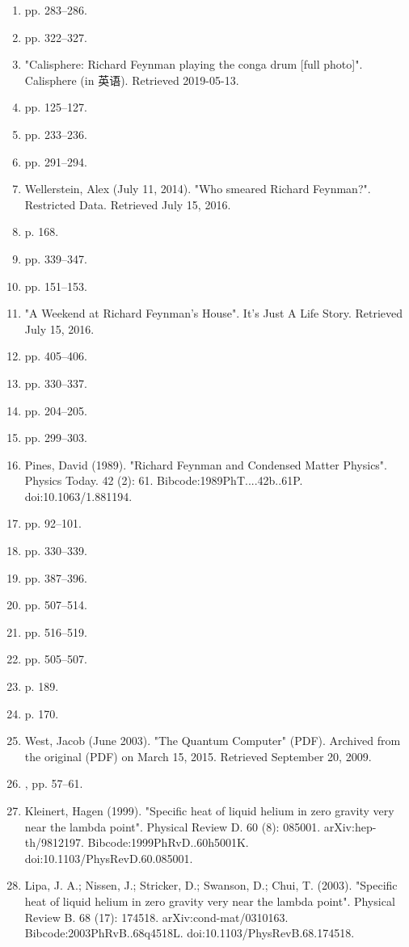 \begin{enumerate}
\item  pp. 283–286.
\item  pp. 322–327.
\item "Calisphere: Richard Feynman playing the conga drum [full photo]". Calisphere (in 英语). Retrieved 2019-05-13.
\item  pp. 125–127.
\item  pp. 233–236.
\item  pp. 291–294.
\item Wellerstein, Alex (July 11, 2014). "Who smeared Richard Feynman?". Restricted Data. Retrieved July 15, 2016.
\item  p. 168.
\item  pp. 339–347.
\item  pp. 151–153.
\item "A Weekend at Richard Feynman's House". It's Just A Life Story. Retrieved July 15, 2016.
\item  pp. 405–406.
\item  pp. 330–337.
\item  pp. 204–205.
\item  pp. 299–303.
\item Pines, David (1989). "Richard Feynman and Condensed Matter Physics". Physics Today. 42 (2): 61. Bibcode:1989PhT....42b..61P. doi:10.1063/1.881194.
\item  pp. 92–101.
\item  pp. 330–339.
\item  pp. 387–396.
\item  pp. 507–514.
\item  pp. 516–519.
\item  pp. 505–507.
\item  p. 189.
\item  p. 170.
\item West, Jacob (June 2003). "The Quantum Computer" (PDF). Archived from the original (PDF) on March 15, 2015. Retrieved September 20, 2009.
\item , pp. 57–61.
\item Kleinert, Hagen (1999). "Specific heat of liquid helium in zero gravity very near the lambda point". Physical Review D. 60 (8): 085001. arXiv:hep-th/9812197. Bibcode:1999PhRvD..60h5001K. doi:10.1103/PhysRevD.60.085001.
\item Lipa, J. A.; Nissen, J.; Stricker, D.; Swanson, D.; Chui, T. (2003). "Specific heat of liquid helium in zero gravity very near the lambda point". Physical Review B. 68 (17): 174518. arXiv:cond-mat/0310163. Bibcode:2003PhRvB..68q4518L. doi:10.1103/PhysRevB.68.174518.

\end{enumerate}
